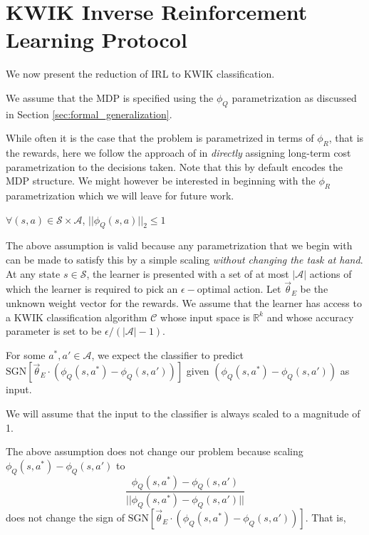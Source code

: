 \section{KWIK Inverse Reinforcement Learning Protocol}

We now present the reduction of IRL to KWIK classification. 
\begin{assumption}
We assume that the MDP is specified using the $\phi_Q$ parametrization as discussed in Section \ref{sec:formal_generalization}. 
\end{assumption}

While often it is the case that the problem is parametrized in terms of $\phi_R$, that is the rewards, here we follow the approach of \citet{DBLP:conf/icra/SilverBS12} in \textit{directly} assigning long-term cost parametrization to the decisions taken. Note that this by default encodes the MDP structure. We might however be interested in beginning with the $\phi_R$ parametrization which we will leave for future work. \\

\begin{assumption}
$\forall (s,a) \in \mathcal{S} \times \mathcal{A}$,  $||\phi_Q(s,a)||_2 \leq 1$  
\end{assumption}

The above assumption is valid because any parametrization that we begin with can be made to satisfy this by a simple scaling \textit{without  changing the task at hand}.\\


At any state $s \in \mathcal{S}$, the learner is presented with a set of at most $|\mathcal{A}|$ actions of which the learner is required to pick an $\epsilon-$optimal action. Let $\vec{\theta}_E$ be the unknown weight vector for the rewards.  We assume that the learner has access to a KWIK classification algorithm $\mathcal{C}$ whose input space is $\mathbb{R}^k$ and whose accuracy parameter is set to be $\epsilon/(|\mathcal{A}|-1)$.  

For some $a^*,a' \in \mathcal{A}$, we expect the classifier to predict $\text{SGN}[\vec{\theta}_E \cdot(\phi_Q(s,a^*) - \phi_Q(s,a'))]$ given $(\phi_Q(s,a^*) - \phi_Q(s,a'))$ as input. 

\begin{assumption}
We will assume that the input to the classifier is always scaled to a magnitude of 1. 
\end{assumption}

The above assumption does not change our problem because scaling $\phi_Q(s,a^*) - \phi_Q(s,a')$ to \[\frac{\phi_Q(s,a^*) - \phi_Q(s,a')}{||\phi_Q(s,a^*) - \phi_Q(s,a') ||}\]
does not change the sign of $\text{SGN}[\vec{\theta}_E \cdot(\phi_Q(s,a^*) - \phi_Q(s,a'))]$.
That is,

